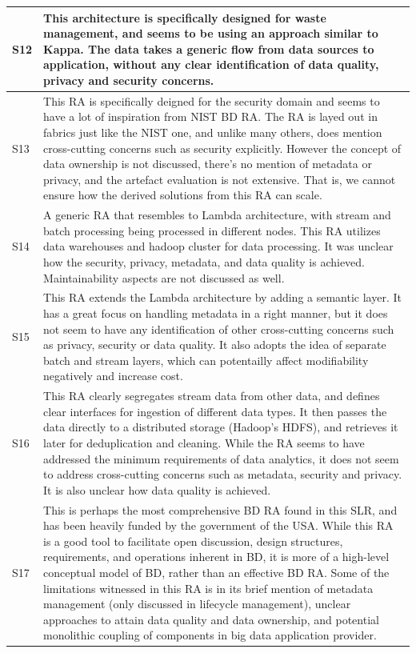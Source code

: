 \documentclass{ieeeaccess}
\begin{document}
\begin{table}
\begin{tabular}{|p{0.3cm}|p{16.8cm}|}
        \hline
        S12 & This architecture is specifically designed for waste management, and seems to be using an approach similar to Kappa. The data takes a generic flow from data sources to application, without any clear identification of data quality, privacy and security concerns.    \\
        \hline
        S13 & This RA is specifically deigned for the security domain and seems to have a lot of inspiration from NIST BD RA. The RA is layed out in fabrics just like the NIST one, and unlike many others, does mention cross-cutting concerns such as security explicitly. However the concept of data ownership is not discussed, there's no mention of metadata or privacy, and the artefact evaluation is not extensive. That is, we cannot ensure how the derived solutions from this RA can scale.    \\
        \hline
        S14 & A generic RA that resembles to Lambda architecture, with stream and batch processing being processed in different nodes. This RA utilizes data warehouses and hadoop cluster for data processing. It was unclear how the security, privacy, metadata, and data quality is achieved. Maintainability aspects are not discussed as well. \\
        \hline
        S15 & This RA extends the Lambda architecture by adding a semantic layer. It has a great focus on handling metadata in a right manner, but it does not seem to have any identification of other cross-cutting concerns such as privacy, security or data quality. It also adopts the idea of separate batch and stream layers, which can potentailly affect modifiability negatively and increase cost. \\
        \hline
        S16 & This RA clearly segregates stream data from other data, and defines clear interfaces for ingestion of different data types. It then passes the data directly to a distributed storage (Hadoop's HDFS), and retrieves it later for deduplication and cleaning. While the RA seems to have addressed the minimum requirements of data analytics, it does not seem to address cross-cutting concerns such as metadata, security and privacy. It is also unclear how data quality is achieved. \\
        \hline
        S17 & This is perhaps the most comprehensive BD RA found in this SLR, and has been heavily funded by the government of the USA. While this RA is a good tool to facilitate open discussion, design structures, requirements, and operations inherent in BD, it is more of a high-level conceptual model of BD, rather than an effective BD RA. Some of the limitations witnessed in this RA is in its brief mention of metadata management (only discussed in lifecycle management), unclear approaches to attain data quality and data ownership, and potential monolithic coupling of components in big data application provider. \\

\end{tabular}
\end{table}
\end{document}
